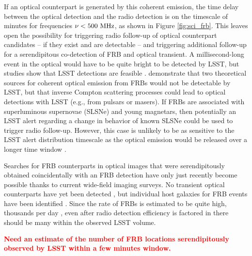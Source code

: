 \documentclass[DM,lsstdraft,authoryear,toc]{lsstdoc}
\begin{document}
If an optical counterpart is generated by this coherent emission, the time delay between the optical detection and the radio detection is on the timescale of minutes for frequencies $\nu < 500\ {\rm MHz}$, as shown in Figure \ref{fig:sci_frb}.
This leaves open the possibility for triggering radio follow-up of optical counterpart candidates -- if they exist and are detectable -- and triggering additional follow-up for a serendipitous co-detection of FRB and optical transient.
A millisecond-long event in the optical would have to be quite bright to be detected by LSST, but studies show that LSST detections are feasible \citep{2016ApJ...824L..18L}.
\cite{2019ApJ...878...89Y} demonstrate that two theoretical sources for coherent optical emission from FRBs would not be detectable by LSST, but that inverse Compton scattering processes could lead to optical detections with LSST (e.g., from pulsars or masers).
If FRBs are associated with superluminous supernovae (SLSNe) and young magnetars, then potentially an LSST alert regarding a change in behavior of known SLSNe could be used to trigger radio follow-up.
However, this case is unlikely to be as sensitive to the LSST alert distribution timescale as the optical emission would be released over a longer time window \citep{2019arXiv191002036L}.

Searches for FRB counterparts in optical images that were serendipitously obtained coincidentally with an FRB detection have only just recently become possible thanks to current wide-field imaging surveys.
No transient optical counterparts have yet been detected \citep{2019ApJ...881...30T}, but individual host galaxies for FRB events have been identified \citep{2016Natur.530..453K}.
Since the rate of FRBs is estimated to be quite high, thousands per day \citep{2016MNRAS.460L..30C}, even after radio detection efficiency is factored in there should be many within the observed LSST volume.

\textcolor{red}{\bf Need an estimate of the number of FRB locations serendipitously observed by LSST within a few minutes window.}
\end{document}
